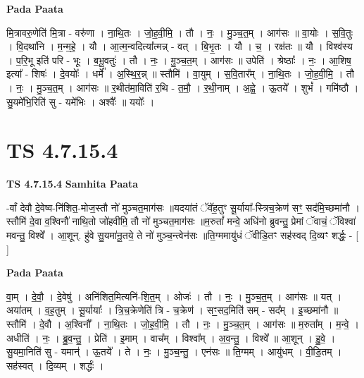 \documentclass[17pt]{extarticle}
\begin{document}
\textbf{Pada Paata} \newline

मि॒त्रावरु॒णेति॑ मि॒त्रा - वरु॑णा । ना॒थि॒तः । जो॒ह॒वी॒मि॒ । तौ । नः॒ । मु॒ञ्च॒त॒म् । आग॑सः ॥ वा॒योः । स॒वि॒तुः । वि॒दथा॑नि । म॒न्म॒हे॒ । यौ । आ॒त्म॒न्वदित्या᳚त्मन्न् - वत् । बि॒भृ॒तः । यौ । च॒ । रक्ष॑तः ॥ यौ । विश्व॑स्य । प॒रि॒भू इति॑ परि - भूः । ब॒भू॒वतुः॑ । तौ । नः॒ । मु॒ञ्च॒त॒म् । आग॑सः ॥ उपेति॑ । श्रेष्ठाः᳚ । नः॒ । आ॒शिष॒ इत्या᳚ - शिषः॑ । दे॒वयोः᳚ । धर्मे᳚ । अ॒स्थि॒र॒न्न् ॥ स्तौमि॑ । वा॒युम् । स॒वि॒तार᳚म् । ना॒थि॒तः । जो॒ह॒वी॒मि॒ । तौ । नः॒ । मु॒ञ्च॒त॒म् । आग॑सः ॥ र॒थीत॑मा॒विति॑ र॒थि - त॒मौ॒ । र॒थी॒नाम् । अ॒ह्वे॒ । ऊ॒तये᳚ । शुभं᳚ । गमि॑ष्ठौ । सु॒यमे॑भि॒रिति॑ सु - यमे॑भिः । अश्वैः᳚ ॥ ययोः᳚ ।  \newline




\section*{ TS 4.7.15.4 }

\textbf{TS 4.7.15.4 } \newline
\textbf{Samhita Paata} \newline

-र्वां देवौ दे॒वेष्व-नि॑शित॒-मोज॒स्तौ नो॑ मुञ्चत॒माग॑सः ॥यदया॑तं ॅवॅह॒तुꣳ सू॒र्याया᳚-स्त्रिच॒क्रेण॑ सꣳ॒॒ सद॑मि॒च्छमा॑नौ ।स्तौमि॑ दे॒वा व॒श्विनौ॑ नाथि॒तो जो॑हवीमि॒ तौ नो॑ मुञ्चत॒माग॑सः ॥म॒रुतां᳚ मन्वे॒ अधि॑नो ब्रुवन्तु॒ प्रेमां ॅवाचं॒ ॅविश्वा॑ मवन्तु॒ विश्वे᳚ । आ॒शून्. हु॑वे सु॒यमा॑नू॒तये॒ ते नो॑ मुञ्च॒न्त्वेन॑सः ॥ति॒ग्ममायु॑धं ॅवीडि॒तꣳ सह॑स्वद् दि॒व्यꣳ शर्द्धः॒ - [  ] \newline

\textbf{Pada Paata} \newline

वा॒म् । दे॒वौ॒ । दे॒वेषु॑ । अनि॑शित॒मित्यनि॑-शि॒त॒म् । ओजः॑ । तौ । नः॒ । मु॒ञ्च॒त॒म् । आग॑सः ॥ यत् । अया॑तम् । व॒ह॒तुम् । सू॒र्यायाः᳚ । त्रि॒च॒क्रेणेति॑ त्रि - च॒क्रेण॑ । सꣳ॒॒सद॒मिति॑ सम् - सद᳚म् । इ॒च्छमा॑नौ ॥ स्तौमि॑ । दे॒वौ । अ॒श्विनौ᳚ । ना॒थि॒तः । जो॒ह॒वी॒मि॒ । तौ । नः॒ । मु॒ञ्च॒त॒म् । आग॑सः ॥ म॒रुता᳚म् । म॒न्वे॒ । अधीति॑ । नः॒ । ब्रु॒व॒न्तु॒ । प्रेति॑ । इ॒माम् । वाच᳚म् । विश्वा᳚म् । अ॒व॒न्तु॒ । विश्वे᳚ ॥ आ॒शून् । हु॒वे॒ । सु॒यमा॒निति॑ सु - यमान्॑ । ऊ॒तये᳚ । ते । नः॒ । मु॒ञ्च॒न्तु॒ । एन॑सः ॥ ति॒ग्मम् । आयु॑धम् । वी॒डि॒तम् । सह॑स्वत् । दि॒व्यम् । शर्द्धः॑ ।  \newline
\end{document}
